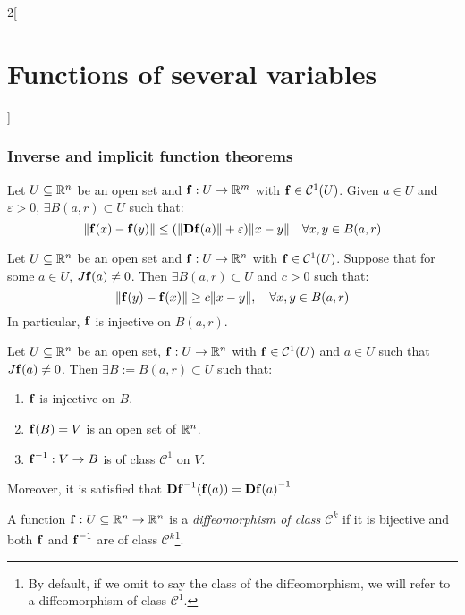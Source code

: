 \documentclass[../../../main.tex]{subfiles}
\begin{document}
\begin{multicols}{2}[\section{Functions of several variables}]
  \subsubsection{Inverse and implicit function theorems}
  \begin{lemma}
    Let $U\subseteq\mathbb{R}^n$ be an open set and $\boldsymbol{\mathrm{f}}:U\rightarrow\mathbb{R}^m$ with $\boldsymbol{\mathrm{f}}\in \mathcal{C}^1(U)$. Given $a\in U$ and $\varepsilon>0$, $\exists B(a,r)\subset U$ such that: $$\|\boldsymbol{\mathrm{f}}(x)-\boldsymbol{\mathrm{f}}(y)\|\leq(\|\boldsymbol{\mathrm{Df}}(a)\|+\varepsilon)\|x-y\|\quad\forall x,y\in B(a,r)$$
  \end{lemma}
  \begin{lemma}
    Let $U\subseteq\mathbb{R}^n$ be an open set and $\boldsymbol{\mathrm{f}}:U\rightarrow\mathbb{R}^n$ with $\boldsymbol{\mathrm{f}}\in \mathcal{C}^1(U)$. Suppose that for some $a\in U$, $J\boldsymbol{\mathrm{f}}(a)\ne 0$. Then $\exists B(a,r)\subset U$ and $c>0$ such that: $$\|\boldsymbol{\mathrm{f}}(y)-\boldsymbol{\mathrm{f}}(x)\|\geq c\|x-y\|,\quad\forall x,y\in B(a,r)$$ In particular, $\boldsymbol{\mathrm{f}}$ is injective on $B(a,r)$.
  \end{lemma}
  \begin{theorem}
    Let $U\subseteq\mathbb{R}^n$ be an open set, $\boldsymbol{\mathrm{f}}:U\rightarrow\mathbb{R}^n$ with $\boldsymbol{\mathrm{f}}\in \mathcal{C}^1(U)$ and $a\in U$ such that $J\boldsymbol{\mathrm{f}}(a)\ne0$. Then $\exists B:=B(a,r)\subset U$ such that:
    \begin{enumerate}
      \item $\boldsymbol{\mathrm{f}}$ is injective on $B$.
      \item $\boldsymbol{\mathrm{f}}(B)=V$ is an open set of $\mathbb{R}^n$.
      \item $\boldsymbol{\mathrm{f}}^{-1}:V\rightarrow B$ is of class $\mathcal{C}^1$ on $V$.
    \end{enumerate} Moreover, it is satisfied that $\boldsymbol{\mathrm{D}}{\boldsymbol{\mathrm{f}}}^{-1}(\boldsymbol{\mathrm{f}}(a))={\boldsymbol{\mathrm{Df}}(a)}^{-1}$
  \end{theorem}
  \begin{definition}
    A function $\boldsymbol{\mathrm{f}}:U\subseteq\mathbb{R}^n\rightarrow\mathbb{R}^n$ is a \textit{diffeomorphism of class $\mathcal{C}^k$} if it is bijective and both $\boldsymbol{\mathrm{f}}$ and $\boldsymbol{\mathrm{f}}^{-1}$ are of class $\mathcal{C}^k$\footnote{By default, if we omit to say the class of the diffeomorphism, we will refer to a diffeomorphism of class $\mathcal{C}^1$.}.
  \end{definition}
  \begin{theorem}

\end{theorem}
\end{multicols}
\end{document}
